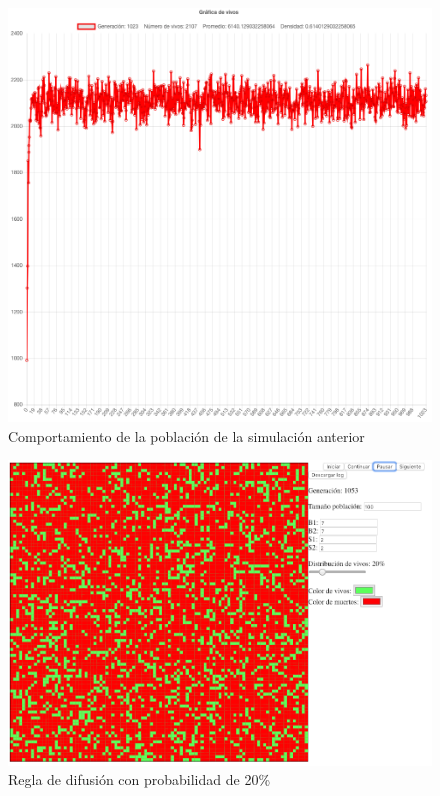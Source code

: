 	\begin{figure}[H]
		\begin{center}
			\includegraphics[scale=.24]{GOL/img/dif10-2.png}
			\caption{Comportamiento de la población de la simulación anterior}
			\label{fig:gol5}
		\end{center}
	\end{figure}

	\begin{figure}[H]
		\begin{center}
			\includegraphics[scale=.3]{GOL/img/dif20-1.png}
			\caption{Regla de difusión con probabilidad de 20\%}
			\label{fig:gol5}
		\end{center}
	\end{figure}

